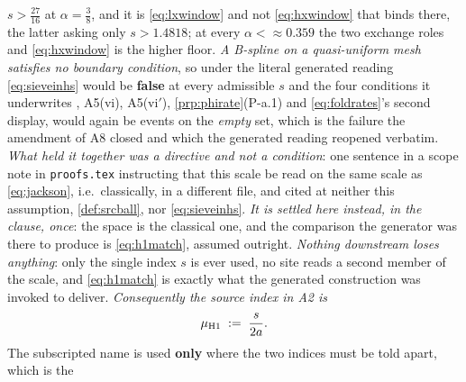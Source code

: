 $s>\tfrac{27}{16}$ at $\alpha=\tfrac38$, and it is \eqref{eq:lxwindow} and not \eqref{eq:hxwindow} that
binds there, the latter asking only $s>1.4818$; at every $\alpha<\approx0.359$ the two exchange roles
and \eqref{eq:hxwindow} is the higher floor.
\emph{A B-spline on a
quasi-uniform mesh satisfies no boundary condition}, so under the literal generated reading
\eqref{eq:sieveinhs} would be \textbf{false} at every admissible $s$ and the four conditions it underwrites
, A5(vi), A5(vi$'$), \cref{prp:phirate}(P-a.1) and \eqref{eq:foldrates}'s
second display, would again be events on the \emph{empty} set, which is the failure the amendment of
A8 closed and which the generated reading reopened verbatim.
\emph{What held it together was a directive and not a condition}: one sentence in a scope note in
\texttt{proofs.tex} instructing that this scale be read on the same scale as \eqref{eq:jackson}, i.e.\
classically, in a different file, and cited at neither this assumption, \cref{def:srcball}, nor
\eqref{eq:sieveinhs}. \emph{It is settled here instead, in the clause, once}: the space is the classical
one, and the comparison the generator was there to produce is \eqref{eq:h1match}, assumed outright.
\emph{Nothing downstream loses anything}: only the single index $s$ is ever used, no site reads a second
member of the scale, and \eqref{eq:h1match} is exactly what the generated construction was invoked to
deliver. \emph{Consequently the source index in A2 is}
\[
\mu_{\text{\textup{H1}}} \;:=\; \frac{s}{2a}.
\]
The subscripted name is used \textbf{only} where the two indices must be told apart, which is the
